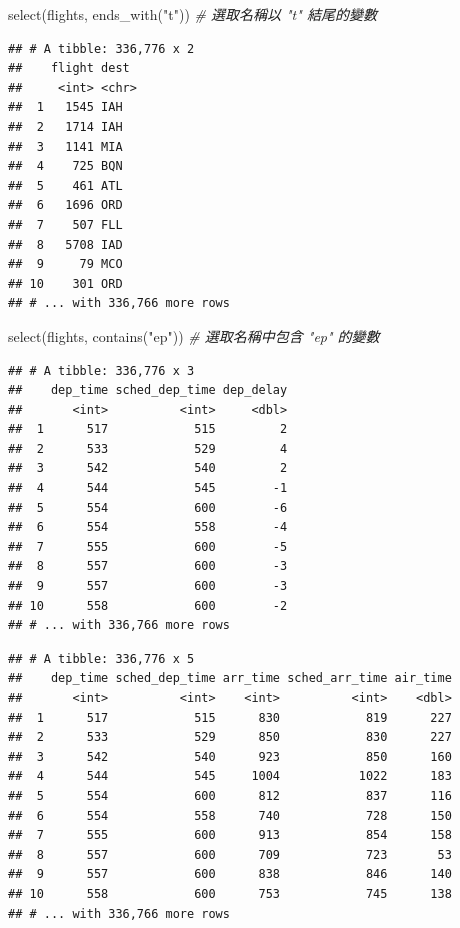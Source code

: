 \documentclass[
]{book}
\newenvironment{Shaded}{\begin{snugshade}}{\end{snugshade}}
\newcommand{\CommentTok}[1]{\textcolor[rgb]{0.56,0.35,0.01}{\textit{#1}}}
\newcommand{\FunctionTok}[1]{\textcolor[rgb]{0.00,0.00,0.00}{#1}}
\newcommand{\NormalTok}[1]{#1}
\newcommand{\StringTok}[1]{\textcolor[rgb]{0.31,0.60,0.02}{#1}}
\theoremstyle{definition}
\theoremstyle{remark}
\begin{document}
\begin{Shaded}
\begin{Highlighting}[]
\FunctionTok{select}\NormalTok{(flights, }\FunctionTok{ends\_with}\NormalTok{(}\StringTok{"t"}\NormalTok{))  }\CommentTok{\# 選取名稱以 "t" 結尾的變數}
\end{Highlighting}
\end{Shaded}

\begin{verbatim}
## # A tibble: 336,776 x 2
##    flight dest 
##     <int> <chr>
##  1   1545 IAH  
##  2   1714 IAH  
##  3   1141 MIA  
##  4    725 BQN  
##  5    461 ATL  
##  6   1696 ORD  
##  7    507 FLL  
##  8   5708 IAD  
##  9     79 MCO  
## 10    301 ORD  
## # ... with 336,766 more rows
\end{verbatim}

\begin{Shaded}
\begin{Highlighting}[]
\FunctionTok{select}\NormalTok{(flights, }\FunctionTok{contains}\NormalTok{(}\StringTok{"ep"}\NormalTok{))  }\CommentTok{\# 選取名稱中包含 "ep" 的變數}
\end{Highlighting}
\end{Shaded}

\begin{verbatim}
## # A tibble: 336,776 x 3
##    dep_time sched_dep_time dep_delay
##       <int>          <int>     <dbl>
##  1      517            515         2
##  2      533            529         4
##  3      542            540         2
##  4      544            545        -1
##  5      554            600        -6
##  6      554            558        -4
##  7      555            600        -5
##  8      557            600        -3
##  9      557            600        -3
## 10      558            600        -2
## # ... with 336,766 more rows
\end{verbatim}

\begin{Shaded}
\end{Shaded}

\begin{verbatim}
## # A tibble: 336,776 x 5
##    dep_time sched_dep_time arr_time sched_arr_time air_time
##       <int>          <int>    <int>          <int>    <dbl>
##  1      517            515      830            819      227
##  2      533            529      850            830      227
##  3      542            540      923            850      160
##  4      544            545     1004           1022      183
##  5      554            600      812            837      116
##  6      554            558      740            728      150
##  7      555            600      913            854      158
##  8      557            600      709            723       53
##  9      557            600      838            846      140
## 10      558            600      753            745      138
## # ... with 336,766 more rows
\end{verbatim}
\end{document}
